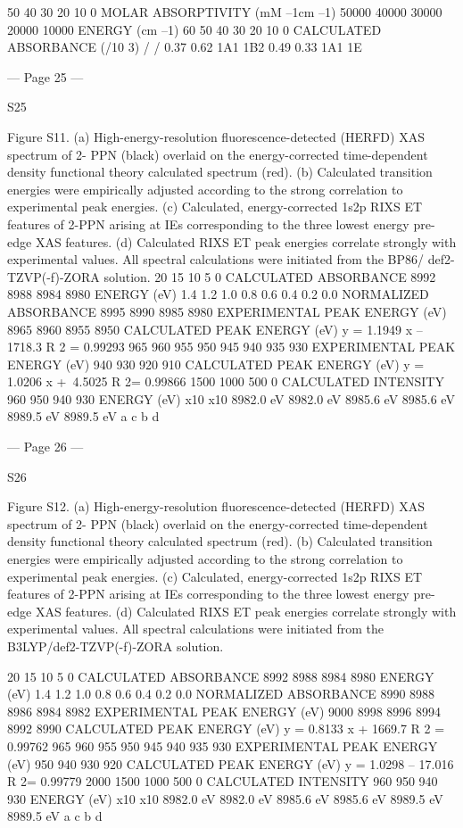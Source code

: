  
50
40
30
20
10
0
MOLAR ABSORPTIVITY (mM
–1cm
–1)
50000
40000
30000
20000
10000
ENERGY (cm
–1)
60
50
40
30
20
10
0
CALCULATED ABSORBANCE (/10
3)
/ 
/ 
0.37 
0.62 
1A1  
1B2  
0.49 
0.33 
1A1  
1E  


--- Page 25 ---
 
S25 
 
Figure S11. (a) High-energy-resolution fluorescence-detected (HERFD) XAS spectrum of 2-
PPN (black) overlaid on the energy-corrected time-dependent density functional theory 
calculated spectrum (red). (b) Calculated transition energies were empirically adjusted according 
to the strong correlation to experimental peak energies. (c) Calculated, energy-corrected 1s2p 
RIXS ET features of 2-PPN arising at IEs corresponding to the three lowest energy pre-edge 
XAS features. (d) Calculated RIXS ET peak energies correlate strongly with experimental 
values. All spectral calculations were initiated from the BP86/ def2-TZVP(-f)-ZORA solution. 
20
15
10
5
0
CALCULATED ABSORBANCE
8992
8988
8984
8980
ENERGY (eV)
1.4
1.2
1.0
0.8
0.6
0.4
0.2
0.0
NORMALIZED ABSORBANCE
8995
8990
8985
8980
EXPERIMENTAL PEAK ENERGY (eV)
8965
8960
8955
8950
CALCULATED PEAK ENERGY (eV)
y = 1.1949 x – 1718.3
R
2 = 0.99293
965
960
955
950
945
940
935
930
EXPERIMENTAL PEAK ENERGY (eV)
940
930
920
910
CALCULATED PEAK ENERGY (eV)
y = 1.0206 x + 4.5025
R
2= 0.99866
1500
1000
500
0
CALCULATED INTENSITY
960
950
940
930
ENERGY (eV)
x10 
x10 
8982.0 eV 
8982.0 eV 
8985.6 eV 
8985.6 eV 
8989.5 eV 
8989.5 eV 
a 
c 
b 
d 


--- Page 26 ---
 
S26 
 
Figure S12. (a) High-energy-resolution fluorescence-detected (HERFD) XAS spectrum of 2-
PPN (black) overlaid on the energy-corrected time-dependent density functional theory 
calculated spectrum (red). (b) Calculated transition energies were empirically adjusted according 
to the strong correlation to experimental peak energies. (c) Calculated, energy-corrected 1s2p 
RIXS ET features of 2-PPN arising at IEs corresponding to the three lowest energy pre-edge 
XAS features. (d) Calculated RIXS ET peak energies correlate strongly with experimental 
values. All spectral calculations were initiated from the B3LYP/def2-TZVP(-f)-ZORA solution. 
 
 
 
 
 
 
20
15
10
5
0
CALCULATED ABSORBANCE
8992
8988
8984
8980
ENERGY (eV)
1.4
1.2
1.0
0.8
0.6
0.4
0.2
0.0
NORMALIZED ABSORBANCE
8990
8988
8986
8984
8982
EXPERIMENTAL PEAK ENERGY (eV)
9000
8998
8996
8994
8992
8990
CALCULATED PEAK ENERGY (eV)
y = 0.8133 x + 1669.7
R
2 = 0.99762
965
960
955
950
945
940
935
930
EXPERIMENTAL PEAK ENERGY (eV)
950
940
930
920
CALCULATED PEAK ENERGY (eV)
y = 1.0298 – 17.016
R
2= 0.99779
2000
1500
1000
500
0
CALCULATED INTENSITY
960
950
940
930
ENERGY (eV)
x10 
x10 
8982.0 eV 
8982.0 eV 
8985.6 eV 
8985.6 eV 
8989.5 eV 
8989.5 eV 
a 
c 
b 
d 


